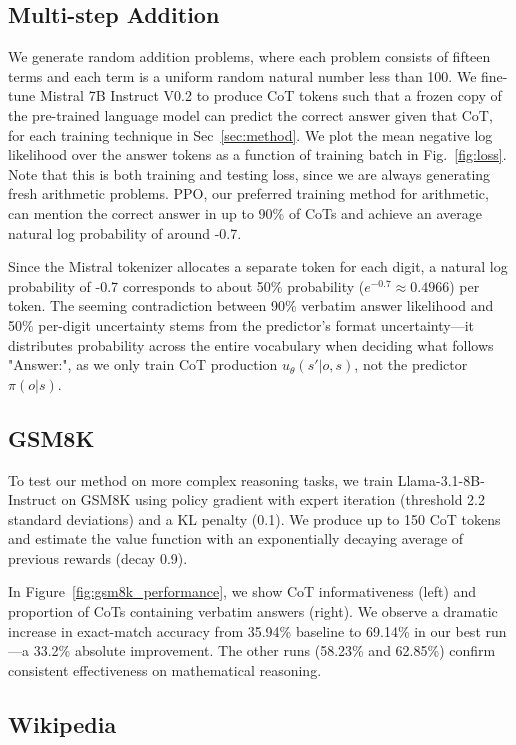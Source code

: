 \documentclass{article}
\begin{document}
\subsection{Multi-step Addition}
\label{subsec:solving}
We generate random addition problems, where each problem consists of fifteen terms and each term is a uniform random natural number less than 100. We fine-tune Mistral 7B Instruct V0.2 to produce CoT tokens such that a frozen copy of the pre-trained language model can predict the correct answer given that CoT, for each training technique in Sec~\ref{sec:method}. We plot the mean negative log likelihood over the answer tokens as a function of training batch in Fig.~\ref{fig:loss}. Note that this is both training and testing loss, since we are always generating fresh arithmetic problems. PPO, our preferred training method for arithmetic, can mention the correct answer in up to 90\% of CoTs and achieve an average natural log probability of around -0.7. 

Since the Mistral tokenizer allocates a separate token for each digit, a natural log probability of -0.7 corresponds to about 50\% probability ($e^{-0.7} \approx 0.4966$) per token. The seeming contradiction between 90\% verbatim answer likelihood and 50\% per-digit uncertainty stems from the predictor's format uncertainty—it distributes probability across the entire vocabulary when deciding what follows "Answer:", as we only train CoT production $u_\theta(s'|o,s)$, not the predictor $\pi(o|s)$.

\subsection{GSM8K}
\label{subsec:gsm8k}
To test our method on more complex reasoning tasks, we train Llama-3.1-8B-Instruct on GSM8K using policy gradient with expert iteration (threshold 2.2 standard deviations) and a KL penalty (0.1). We produce up to 150 CoT tokens and estimate the value function with an exponentially decaying average of previous rewards (decay 0.9).

In Figure~\ref{fig:gsm8k_performance}, we show CoT informativeness (left) and proportion of CoTs containing verbatim answers (right). We observe a dramatic increase in exact-match accuracy from 35.94\% baseline to 69.14\% in our best run—a 33.2\% absolute improvement. The other runs (58.23\% and 62.85\%) confirm consistent effectiveness on mathematical reasoning.

\subsection{Wikipedia}
\label{subsec:wikipedia}
\end{document}
